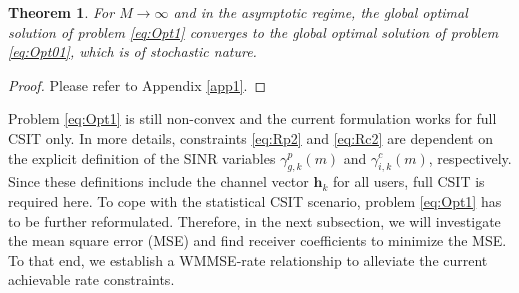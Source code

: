 \documentclass[12pt,draftcls,onecolumn]{IEEEtran}
\newtheorem{theorem}{Theorem}
\theoremstyle{remark}
\theoremstyle{definition}
\begin{document}
{\begin{theorem}\label{th1}
	For $M\rightarrow\infty$ and in the asymptotic regime, the global optimal solution of problem \eqref{eq:Opt1} converges to the global optimal solution of problem \eqref{eq:Opt01}, which is of stochastic nature.
\end{theorem}
\begin{proof}
	Please refer to Appendix \ref{app1}.
\end{proof}
Problem \eqref{eq:Opt1} is still non-convex and the current formulation works for full CSIT only. In more details, constraints \eqref{eq:Rp2} and \eqref{eq:Rc2} are dependent on the explicit definition of the SINR variables $\gamma_{g, k}^p(m)$ and $\gamma_{i, k}^c(m)$, respectively. Since these definitions include the channel vector $\mathbf{h}_k$ for all users, full CSIT is required here. To cope with the statistical CSIT scenario, problem \eqref{eq:Opt1} has to be further reformulated. Therefore, in the next subsection, we will investigate the mean square error (MSE) and find receiver coefficients to minimize the MSE. To that end, we establish a WMMSE-rate relationship to alleviate the current achievable rate constraints.
}
\end{document}
